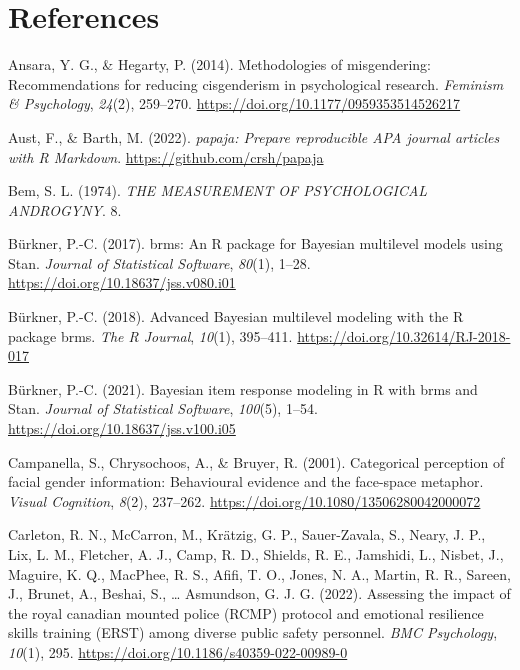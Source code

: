 \documentclass[
  man]{apa7}
\newlength{\cslhangindent}
\newlength{\cslentryspacingunit} %
\newenvironment{CSLReferences}[2] %
 {%
  \setlength{\parindent}{0pt}
  \ifodd #1
  \let\oldpar\par
  \def\par{\hangindent=\cslhangindent\oldpar}
  \fi
  \setlength{\parskip}{#2\cslentryspacingunit}
 }%
 {}
\begin{document}
\newpage

\hypertarget{references}{%
\section{References}\label{references}}

\hypertarget{refs}{}
\begin{CSLReferences}{1}{0}
\leavevmode{}%
Ansara, Y. G., \& Hegarty, P. (2014). Methodologies of misgendering: Recommendations for reducing cisgenderism in psychological research. \emph{Feminism \& Psychology}, \emph{24}(2), 259--270. \url{https://doi.org/10.1177/0959353514526217}

\leavevmode{}%
Aust, F., \& Barth, M. (2022). \emph{{papaja}: {Prepare} reproducible {APA} journal articles with {R Markdown}}. \url{https://github.com/crsh/papaja}

\leavevmode{}%
Bem, S. L. (1974). \emph{{THE} {MEASUREMENT} {OF} {PSYCHOLOGICAL} {ANDROGYNY}}. 8.

\leavevmode{}%
Bürkner, P.-C. (2017). {brms}: An {R} package for {Bayesian} multilevel models using {Stan}. \emph{Journal of Statistical Software}, \emph{80}(1), 1--28. \url{https://doi.org/10.18637/jss.v080.i01}

\leavevmode{}%
Bürkner, P.-C. (2018). Advanced {Bayesian} multilevel modeling with the {R} package {brms}. \emph{The R Journal}, \emph{10}(1), 395--411. \url{https://doi.org/10.32614/RJ-2018-017}

\leavevmode{}%
Bürkner, P.-C. (2021). Bayesian item response modeling in {R} with {brms} and {Stan}. \emph{Journal of Statistical Software}, \emph{100}(5), 1--54. \url{https://doi.org/10.18637/jss.v100.i05}

\leavevmode{}%
Campanella, S., Chrysochoos, A., \& Bruyer, R. (2001). Categorical perception of facial gender information: Behavioural evidence and the face-space metaphor. \emph{Visual Cognition}, \emph{8}(2), 237--262. \url{https://doi.org/10.1080/13506280042000072}

\leavevmode{}%
Carleton, R. N., McCarron, M., Krätzig, G. P., Sauer-Zavala, S., Neary, J. P., Lix, L. M., Fletcher, A. J., Camp, R. D., Shields, R. E., Jamshidi, L., Nisbet, J., Maguire, K. Q., MacPhee, R. S., Afifi, T. O., Jones, N. A., Martin, R. R., Sareen, J., Brunet, A., Beshai, S., \ldots{} Asmundson, G. J. G. (2022). Assessing the impact of the royal canadian mounted police ({RCMP}) protocol and emotional resilience skills training ({ERST}) among diverse public safety personnel. \emph{{BMC} Psychology}, \emph{10}(1), 295. \url{https://doi.org/10.1186/s40359-022-00989-0}


\end{CSLReferences}
\end{document}
